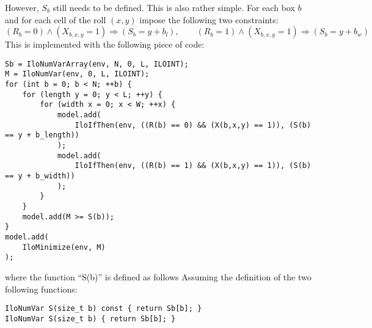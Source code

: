 However, $S_b$ still needs to be defined. This is also rather simple. For each box $b$ and for
each cell of the roll $(x,y)$ impose the following two constraints:
\[
(R_b = 0) \wedge (X_{b,x,y} = 1) \Longrightarrow (S_b = y + b_l), \qquad
(R_b = 1) \wedge (X_{b,x,y} = 1) \Longrightarrow (S_b = y + b_w)
\]
This is implemented with the following piece of code:
{\NOINDENT \begin{lstlisting}
Sb = IloNumVarArray(env, N, 0, L, ILOINT);
M = IloNumVar(env, 0, L, ILOINT);
for (int b = 0; b < N; ++b) {
	for (length y = 0; y < L; ++y) {
		for (width x = 0; x < W; ++x) {
			model.add(
				IloIfThen(env, ((R(b) == 0) && (X(b,x,y) == 1)), (S(b) == y + b_length))
			);
			model.add(
				IloIfThen(env, ((R(b) == 1) && (X(b,x,y) == 1)), (S(b) == y + b_width))
			);
		}
	}
	model.add(M >= S(b));
}
model.add(
	IloMinimize(env, M)
);
\end{lstlisting}}
where the function ``S(b)'' is defined as follows
Assuming the definition of the two following functions:
{\NOINDENT \begin{lstlisting}
IloNumVar S(size_t b) const { return Sb[b]; }
IloNumVar S(size_t b) { return Sb[b]; }
\end{lstlisting}}
